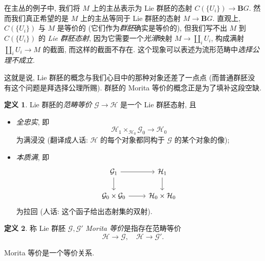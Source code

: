 \documentclass{article}
\theoremstyle{definition}
\newtheorem{definition}{定义}[section]
\begin{document}
	在主丛的例子中, 我们将 $M$ 上的主丛表示为 Lie 群胚的态射 $C(\{U_i\})\to \mathbf BG$. 然而我们真正希望的是 $M$ 上的主丛等同于 Lie 群胚的态射 $M\to\mathbf BG$. 直观上, $C(\{U_i\})$ 与 $M$ 是等价的 (它们作为\emph{群胚}确实是等价的), 但我们写不出 $M$ 到 $C(\{U_i\})$ 的 \emph{Lie 群胚态射}, 因为它需要一个\emph{光滑}映射 $M\to \coprod_i U_i$, 构成满射 $\coprod_i U_i\to M$ 的截面, 而这样的截面不存在. 这个现象可以表述为流形范畴中\emph{选择公理不成立}.
	
	这就是说, Lie 群胚的概念与我们心目中的那种对象还差了一点点 (而普通群胚没有这个问题是拜选择公理所赐). 群胚的 Morita 等价的概念正是为了填补这段空缺.
	
	\begin{definition}
		Lie 群胚的\emph{范畴等价} $\mathcal G\to\mathcal H$ 是一个 Lie 群胚态射, 且
		\begin{itemize}
			\item \emph{全忠实}, 即
			$$
			\mathcal H_1\times_{\mathcal H_0}\mathcal G_0 \to \mathcal H_0
			$$
			为满浸没 (翻译成人话: $\mathcal H$ 的每个对象都同构于 $\mathcal G$ 的某个对象的像);
			\item \emph{本质满}, 即
			\[\begin{tikzcd}[ampersand replacement=\&]
				{\mathcal G_1} \& {\mathcal H_1} \\
				{\mathcal G_0\times \mathcal G_0} \& {\mathcal H_0\times \mathcal H_0}
				\arrow[from=1-1, to=1-2]
				\arrow[from=1-1, to=2-1]
				\arrow[from=1-2, to=2-2]
				\arrow[from=2-1, to=2-2]
			\end{tikzcd}\]
			为拉回 (人话: 这个函子给出态射集的双射).
		\end{itemize}
	\end{definition}
	\begin{definition}
		称 Lie 群胚 $\mathcal G,\mathcal G'$ \emph{Morita 等价}是指存在范畴等价
		$$\mathcal H\to\mathcal G,\quad \mathcal H\to\mathcal G'.$$
	\end{definition}
	Morita 等价是一个等价关系.
	
	
	
\end{document}
